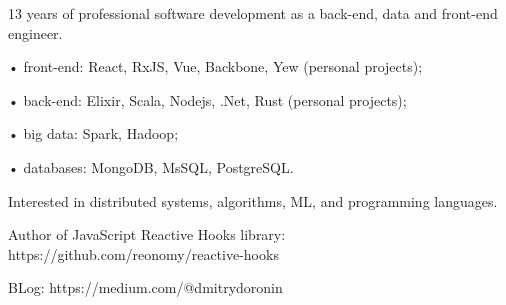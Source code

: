 \documentclass{resume}
\begin{document}

\begin{rSection}{}
13 years of professional software development as a back-end, data and front-end engineer.

• front-end: React, RxJS, Vue, Backbone, Yew (personal projects);

• back-end: Elixir, Scala, Nodejs, .Net, Rust (personal projects);

• big data: Spark, Hadoop;

• databases: MongoDB, MsSQL, PostgreSQL.

Interested in distributed systems, algorithms, ML, and programming languages.

Author of JavaScript Reactive Hooks library: 
https://github.com/reonomy/reactive-hooks

BLog: 
https://medium.com/@dmitrydoronin

\end{rSection}

\end{document}
